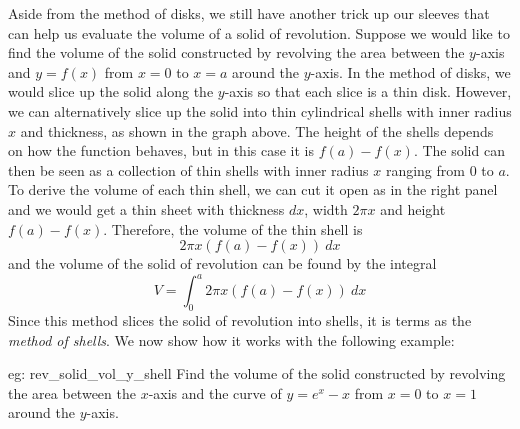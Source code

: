 \medskip
Aside from the method of disks, we still have another trick up our sleeves that can help us evaluate the volume of a solid of revolution.  Suppose we would like to find the volume of the solid constructed by revolving the area between the $y$-axis and $y = f(x)$ from $x = 0$ to $x = a$ around the $y$-axis.  In the method of disks, we would slice up the solid along the $y$-axis so that each slice is a thin disk.  However, we can alternatively slice up the solid into thin cylindrical shells with inner radius $x$ and thickness, as shown in the graph above.  The height of the shells depends on how the function behaves, but in this case it is $f(a)-f(x)$.  The solid can then be seen as a collection of thin shells with inner radius $x$ ranging from $0$ to $a$.  To derive the volume of each thin shell, we can cut it open as in the right panel and we would get a thin sheet with thickness $dx$, width $2 \pi x$ and height $f(a) - f(x)$.  Therefore, the volume of the thin shell is
\[2\pi x (f(a)-f(x))~dx\]
and the volume of the solid of revolution can be found by the integral
\[V = \int_0^a 2\pi x (f(a)-f(x))~dx\]
Since this method slices the solid of revolution into shells, it is terms as the \textit{method of shells}.  We now show how it works with the following example:

\begin{eg}[]{eg: rev_solid_vol_y_shell}
    Find the volume of the solid constructed by revolving the area between the $x$-axis and the curve of $y = e^x - x$ from $x = 0$ to $x = 1$ around the $y$-axis. 
\end{eg}

